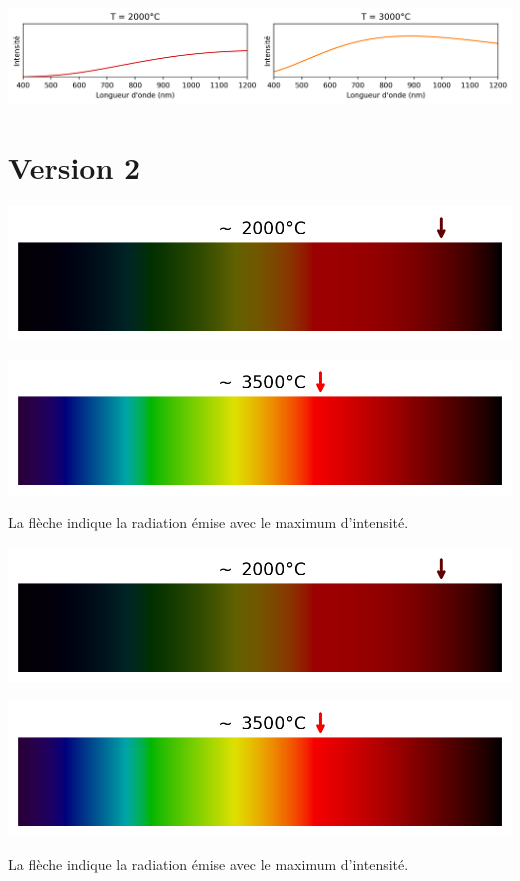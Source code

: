 \documentclass[12pt,a4paper,fleqn]{article}
\begin{document}
\begin{center}
\includegraphics[width=\linewidth]{images/spectrum_black_body_curve3273K.png}
\end{center}

\newpage
\section*{Version 2}

\begin{center}
\begin{multicols}{2}
\includegraphics[width=\linewidth]{images/spectrum_black_body_temp2500K.png}

\includegraphics[width=\linewidth]{images/spectrum_black_body_temp4000K.png}
\end{multicols}
La flèche indique la radiation émise avec le maximum d'intensité.
\end{center}

\begin{center}
\begin{multicols}{2}
\includegraphics[width=\linewidth]{images/spectrum_black_body_temp2500K.png}

\includegraphics[width=\linewidth]{images/spectrum_black_body_temp4000K.png}
\end{multicols}
La flèche indique la radiation émise avec le maximum d'intensité.
\end{center}
\end{document}
